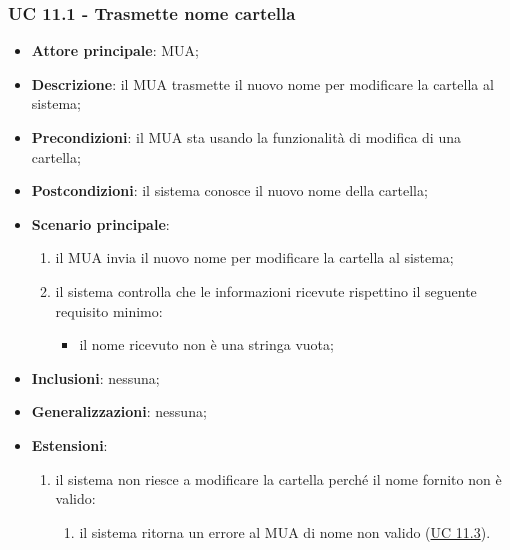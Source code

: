 \subsubsection{UC 11.1 - Trasmette nome cartella} \label{sec:UC11.1}
\begin{itemize}
    \item \textbf{Attore principale}: MUA;
    \item \textbf{Descrizione}: il MUA trasmette il nuovo nome per modificare la cartella al sistema;
    \item \textbf{Precondizioni}: il MUA sta usando la funzionalità di modifica di una cartella;
    \item \textbf{Postcondizioni}: il sistema conosce il nuovo nome della cartella;
    \item \textbf{Scenario principale}:
        \begin{enumerate}
            \item il MUA invia il nuovo nome per modificare la cartella al sistema;
            \item il sistema controlla che le informazioni ricevute rispettino il seguente requisito minimo:
            \begin{itemize}
                \item il nome ricevuto non è una stringa vuota;
            \end{itemize}
        \end{enumerate}
    \item \textbf{Inclusioni}: nessuna;
    \item \textbf{Generalizzazioni}: nessuna;
    \item \textbf{Estensioni}:
        \begin{enumerate}[label=\alph*.]
            \item il sistema non riesce a modificare la cartella perché il nome fornito non è valido:
            \begin{enumerate}[label=\arabic*.]
                \item il sistema ritorna un errore al MUA di nome non valido (\hyperref[sec:UC11.3]{UC 11.3}).
            \end{enumerate}
        \end{enumerate}
\end{itemize}

